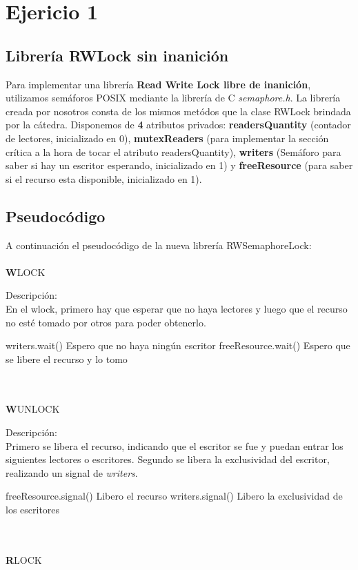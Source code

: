 \section{Ejericio 1}
\subsection{Librería RWLock sin inanición}
Para implementar una librer\'ia \textbf{Read Write Lock libre de inanici\'on}, utilizamos semáforos POSIX mediante la librería de C \textit{semaphore.h}. La librería creada por nosotros consta de los mismos metódos que la clase RWLock brindada por la cátedra. Disponemos de \textbf{4} atributos privados: \textbf{readersQuantity} (contador de lectores, inicializado en 0), \textbf{mutexReaders} (para implementar la sección crítica a la hora de tocar el atributo readersQuantity), \textbf{writers} (Semáforo para saber si hay un escritor esperando, inicializado en 1) y \textbf{freeResource} (para saber si el recurso esta disponible, inicializado en 1).

\subsection{Pseudoc\'odigo}

A continuación el pseudocódigo de la nueva librería RWSemaphoreLock:\\
\mbox{}\\
\textbf WLOCK

Descripción:\\
En el wlock, primero hay que esperar que no haya lectores y luego  que el recurso no esté tomado por otros para poder obtenerlo.
\begin{codebox}

\li	writers.wait() 		\RComment Espero que no haya ningún escritor
\li	freeResource.wait() 	\RComment Espero que se libere el recurso y lo tomo 
\end{codebox}
\mbox{}\\\mbox{}\\
\textbf WUNLOCK
			
Descripción:\\
Primero se libera el recurso, indicando que el escritor se fue y puedan entrar los siguientes lectores o escritores.
Segundo se libera la exclusividad del escritor, realizando un signal de \textit{writers}. 
\begin{codebox}
\li	freeResource.signal()		\RComment Libero el recurso	
\li	writers.signal()		\RComment Libero la exclusividad de los escritores
\end{codebox}
\mbox{}\\\mbox{}\\
\textbf RLOCK

